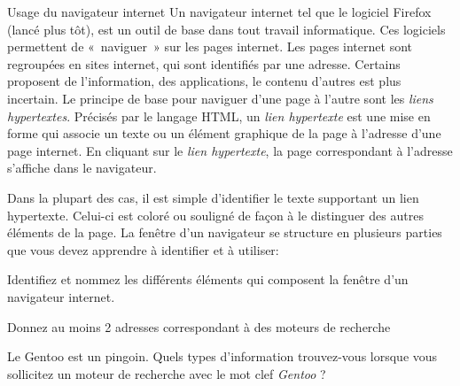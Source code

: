 \begin{exercice}
  \begin{exercicelet}{Usage du navigateur internet}
    Un navigateur internet tel que le logiciel Firefox (lancé plus tôt),
    est un outil de base dans tout travail informatique. Ces logiciels
    permettent de «~naviguer~» sur les pages internet. Les pages
    internet sont regroupées en sites internet, qui sont identifiés par
    une adresse. Certains proposent de l'information, des applications,
    le contenu d'autres est plus incertain.  Le principe de base pour
    naviguer d'une page à l'autre sont les \emph{liens
      hypertextes}. Précisés par le langage HTML, un \emph{lien
      hypertexte} est une mise en forme qui associe un texte ou un
    élément graphique de la page à l'adresse d'une page internet. En
    cliquant sur le \emph{lien hypertexte}, la page correspondant à
    l'adresse s'affiche dans le navigateur.

    Dans la plupart des cas, il est simple d'identifier le texte
    supportant un lien hypertexte. Celui-ci est coloré ou souligné de
    façon à le distinguer des autres éléments de la page.  La fenêtre
    d'un navigateur se structure en plusieurs parties que vous devez
    apprendre à identifier et à utiliser:

    \begin{questions}
    \item Identifiez et nommez les différents éléments qui composent la
      fenêtre d'un navigateur internet.
    \item Donnez au moins 2 adresses correspondant à des moteurs de
      recherche
    \item Le Gentoo est un pingoin. Quels types d'information
      trouvez-vous lorsque vous sollicitez un moteur de recherche avec
      le mot clef \emph{Gentoo} ?
    \end{questions}
  \end{exercicelet}
\end{exercice}
